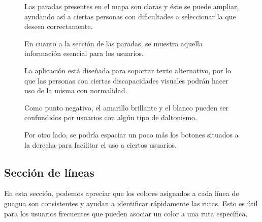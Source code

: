 \documentclass[a4paper,12pt]{article}
\begin{document}
\begin{figure}[htbp]
\begin{minipage}{0.3\textwidth}
        Las paradas presentes en el mapa son claras y éste se puede ampliar, ayudando así a ciertas personas con dificultades a seleccionar la que deseen correctamente.
        
        En cuanto a la sección de las paradas, se muestra aquella información esencial para los usuarios.
        
        La aplicación está diseñada para soportar texto alternativo, por lo que las personas con ciertas discapacidades visuales podrán hacer uso de la misma con normalidad.
        
        Como punto negativo, el amarillo brillante y el blanco pueden ser confundidos por usuarios con algún tipo de daltonismo.
        
        Por otro lado, se podría espaciar un poco más los botones situados a la derecha para facilitar el uso a ciertos usuarios.
    \end{minipage}
\end{figure}

\newpage

\subsection{Sección de líneas}
En esta sección, podemos apreciar que los colores asignados a cada línea de guagua son consistentes y ayudan a identificar rápidamente las rutas. Esto es útil para los usuarios frecuentes que pueden asociar un color a una ruta específica.
\end{document}

